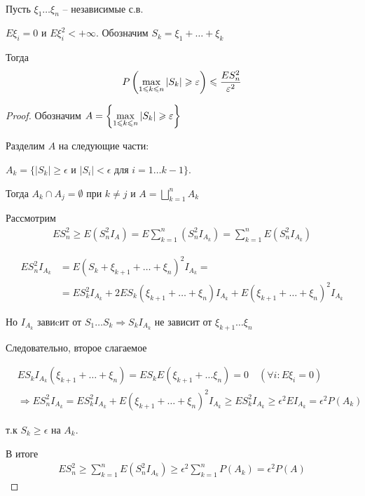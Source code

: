 
\begin{lemma}~

  Пусть $\xi_1 \ldots \xi_n$ -- независимые с.в.

  $E \xi_i = 0$ и $E \xi_i^2 < +\infty$. 
  Обозначим $S_k = \xi_1 + \ldots + \xi_k$

  Тогда
  \begin{align*}
    P\left( \max_{1 \leqslant k \leqslant n}|S_k| \geqslant \varepsilon \right) \leqslant \frac{E S_n^2}{ \varepsilon^2}
  \end{align*}
\end{lemma}

\begin{proof}
  Обозначим $A = \left\{ \max\limits_{1 \leqslant k \leqslant n}{|S_k|} \geqslant \varepsilon  \right\}$
    
  Разделим $A$ на следующие части:

  $A_k = \{|S_k| \geq \epsilon $ и $|S_i| < \epsilon$ для $i = 1 \ldots k - 1\}$.

  Тогда $A_k \cap A_j = \emptyset$ при $k \neq j$ и $A = \bigsqcup\limits_{k = 1}^{n} A_k$

  Рассмотрим 
  \begin{align*}
    E S_n^2 \geq E(S_n^2 I_A) = E \sum_{k = 1}^{n} (S_n^2 I_{A_k}) = \sum_{k = 1}^n E(S_n^2 I_{A_k})
  \end{align*}

  \begin{align*}
    E S_n^2 I_{A_k} &= E(S_k + \xi_{k + 1} + \ldots + \xi_n)^2 I_{A_k} =\\
    &= E S_k^2 I_{A_k} + 2 E S_k (\xi_{k + 1} + \ldots + \xi_n) I_{A_k} + 
    E(\xi_{k + 1} + \ldots + \xi_n)^2 I_{A_k}
  \end{align*}

  Но $I_{A_k}$ завиcит от $S_1 \ldots S_k \Rightarrow S_k I_{A_k}$ 
  не зависит от $\xi_{k + 1} \ldots \xi_n$

  Следовательно, второе слагаемое

  \begin{align*}
    &E S_k I_{A_k} (\xi_{k + 1} + \ldots + \xi_n) = 
    E S_k E(\xi_{k + 1} + \ldots \xi_n) = 0 \quad (\forall i: E \xi_i = 0)\\
    &\Rightarrow E S_n^2 I_{A_k} = E S_k^2 I_{A_k} + E(\xi_{k + 1} + \ldots + \xi_n)^2 I_{A_k} 
    \geq E S_k^2 I_{A_k} \geq \epsilon^ 2 E I_{A_k} = \epsilon^2 P(A_k)
  \end{align*}

  т.к $S_k \geq \epsilon$ на $A_k$.

  В итоге
  \begin{align*}
    E S_n^2 \geq \sum_{k = 1}^{n} E (S_n^2 I_{A_k}) \geq 
    \epsilon^2 \sum_{k = 1}^{n} P(A_k) = \epsilon^2 P(A)
  \end{align*}
\end{proof}

